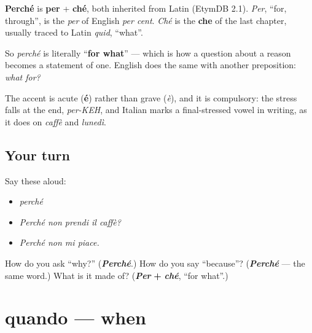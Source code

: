 \begin{cousinweb}
\textbf{Perché} is \textbf{per} + \textbf{ché}, both inherited from Latin (EtymDB 2.1). \emph{Per}, \textquotedblleft{}for, through\textquotedblright{}, is the \emph{per} of English \emph{per cent}. \emph{Ché} is the \textbf{che} of the last chapter, usually traced to Latin \emph{quid}, \textquotedblleft{}what\textquotedblright{}.

So \emph{perché} is literally \textquotedblleft{}\textbf{for what}\textquotedblright{} — which is how a question about a reason becomes a statement of one. English does the same with another preposition: \emph{what for?}

The accent is acute (\textbf{é}) rather than grave (\emph{è}), and it is compulsory: the stress falls at the end, \emph{per-KEH}, and Italian marks a final-stressed vowel in writing, as it does on \emph{caffè} and \emph{lunedì}.
\end{cousinweb}

\subsection*{Your turn}
Say these aloud:

\begin{itemize}
\raggedright
  \item \emph{perché}
  \item \emph{Perché non prendi il caffè?}
  \item \emph{Perché non mi piace.}
\end{itemize}

\begin{tcolorbox}[breakable,colback=teal!4,colframe=teal!35!black,title={Before you move on}]
How do you ask \textquotedblleft{}why?\textquotedblright{} (\emph{\textbf{Perché}}.) How do you say \textquotedblleft{}because\textquotedblright{}? (\emph{\textbf{Perché}} — the same word.) What is it made of? (\emph{\textbf{Per}} \textbf{+} \emph{\textbf{ché}}, \textquotedblleft{}for what\textquotedblright{}.)
\end{tcolorbox}
\section[quando]{quando — when}

\label{lesson:IT-C32-quando}



